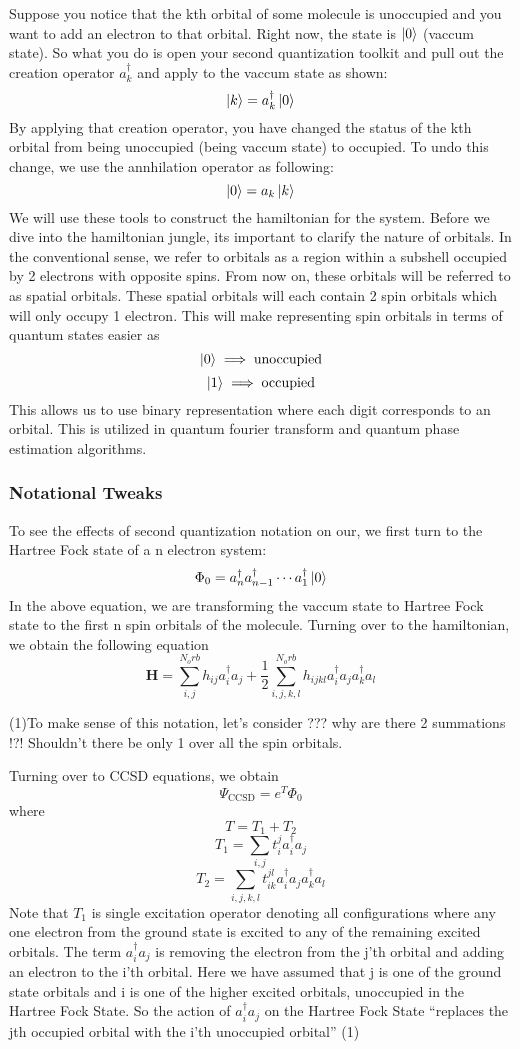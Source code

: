 \documentclass{article}
\begin{document}
    Suppose
    you notice that the kth orbital of some molecule is unoccupied and you want
    to add an electron to that orbital. Right now, the state is
    \(\ket{0}\) (vaccum state). So what you do is open your second quantization
    toolkit and pull out the creation operator \(a^{\dagger}_k\) and apply to the
    vaccum state as shown:
    \[\ket{k} = a^{\dagger}_k\ket{0}\]
    By applying that creation operator, you have changed the status of the kth
    orbital from being unoccupied (being vaccum state) to occupied. To undo this
    change, we use the annhilation operator as following:
    \[\ket{0} = a_k\ket{k}\]
    We will use these tools to construct the hamiltonian for the system. Before we
    dive into the hamiltonian jungle, its important to clarify the nature of
    orbitals. In the conventional sense, we refer to orbitals as a region within
    a subshell occupied by 2 electrons with opposite spins. From now on, these
    orbitals will be referred to as spatial orbitals. These spatial orbitals will
    each contain 2 spin orbitals which will only occupy 1 electron. This will make
    representing spin orbitals in terms of quantum states easier as
    \[\ket{0} \implies \text{unoccupied}\]
    \[\ket{1} \implies \text{occupied}\]
    This allows us to use binary representation where each digit corresponds to
    an orbital. This is utilized in quantum fourier transform and quantum phase
    estimation algorithms.
    \subsubsection{Notational Tweaks}
      To see the effects of second quantization notation on our, we first turn
      to the Hartree Fock state of a n electron system:
        \[\Phi_0 = a^{\dagger}_{n}a^{\dagger}_{n-1}\cdots a^{\dagger}_1\ket{0}\]
      In the above equation, we are transforming the vaccum state to
      Hartree Fock state to the first n spin orbitals of the molecule. Turning
      over to the hamiltonian, we obtain the following equation
      \[\mathbf{H} = \sum_{i,j}^{N_orb}h_{ij}a_i^{\dagger}a_j +
      \frac{1}{2}\sum_{i,j,k,l}^{N_orb}h_{ijkl}a_i^{\dagger}a_ja_k^{\dagger}a_l\]

      (1)To make sense of this notation, let's consider ??? why are there
      2 summations !?! Shouldn't there be only 1 over all the spin orbitals.

      Turning over to CCSD equations, we obtain
      \[\Psi_{\text{CCSD}} = e^{T}\Phi_0\]
      where
      \[T = T_1 + T_2\]
      \[T_1 = \sum_{i,j}t_{i}^{j}a_i^{\dagger}a_j \]
      \[T_2 = \sum_{i,j,k,l}t_{ik}^{jl}a_i^{\dagger}a_ja_k^{\dagger}a_l\]
      Note that \(T_1\) is single excitation operator denoting all configurations
      where any one electron from the ground state is excited to any of the
      remaining excited orbitals. The term \(a_i^{\dagger}a_j\) is removing
      the electron from the j'th orbital and adding an electron to the i'th
      orbital. Here we have assumed that j is one of the ground state orbitals
      and i is one of the higher excited orbitals, unoccupied in the Hartree
      Fock State. So the action of \(a_i^{\dagger}a_j\) on the
      Hartree Fock State ``replaces the
      jth occupied orbital with the i'th unoccupied orbital'' (1)
\end{document}
